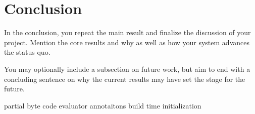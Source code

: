 \chapter{Conclusion}

In the conclusion, you repeat the main result and finalize the discussion of
your project. Mention the core results and why as well as how your system
advances the status quo.

You may optionally include a subsection on future work, but aim to end with a concluding sentence on why the current results may have set the stage for the future.



partial byte code evaluator
annotaitons
build time initialization